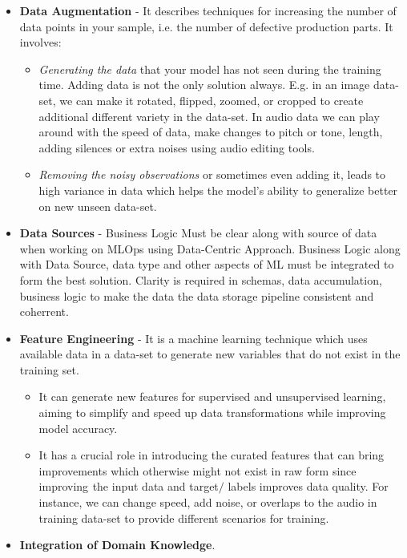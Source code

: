 \begin{itemize}
\begin{itemize}
    \end{itemize}
    \item \textbf{Data Augmentation} - It describes techniques for increasing the number of data points in your sample, i.e. the number of defective production parts. It involves: 
    \begin{itemize} 
        \item \textit{Generating the data} that your model has not seen during the training time. Adding data is not the only solution always. E.g. in an image data-set, we can make it rotated, flipped, zoomed, or cropped to create additional different variety in the data-set. In audio data we can play around with the speed of data, make changes to pitch or tone, length, adding silences or extra noises using audio editing tools.
        \item \textit{Removing the noisy observations} or sometimes even adding it, leads to high variance in data which helps the model's ability to generalize better on new unseen data-set.         
    \end{itemize}
    \item \textbf{Data Sources} - Business Logic Must be clear along with source of data when working on MLOps using Data-Centric Approach. Business Logic along with Data Source, data type and other aspects of ML must be integrated to form the best solution. Clarity is required in schemas, data accumulation, business logic to make the data the data storage pipeline consistent and coherrent.
    \item \textbf{Feature Engineering} - It is a machine learning technique which uses available data in a data-set to generate new variables that do not exist in the training set. 
    \begin{itemize}
        \item It can generate new features for supervised and unsupervised learning, aiming to simplify and speed up data transformations while improving model accuracy.
        \item It has a crucial role in introducing the curated features that can bring improvements which otherwise might not exist in raw form since improving  the input data and target$/$ labels improves data quality. For instance, we can change speed, add noise, or overlaps to the audio in training data-set to provide different scenarios for training.
    \end{itemize}     
    \item \textbf{Integration of Domain Knowledge}. 
    \begin{itemize}

\end{itemize}
\end{itemize}
